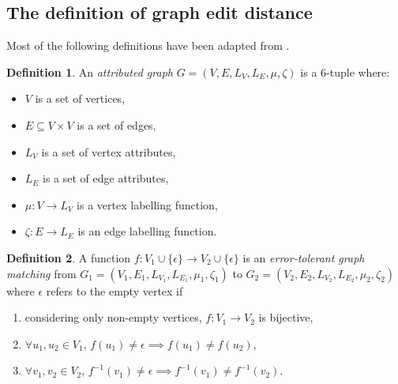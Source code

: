 \documentclass{article}
\theoremstyle{definition}
\newtheorem{definition}{Definition}
\begin{document}
\subsection{The definition of graph edit distance}
\label{sec:ged}
Most of the following definitions have been adapted from \cite{abu-aisheh_2016}.
\begin{definition}
  An \emph{attributed graph} $G = (V, E, L_V, L_E, \mu, \zeta)$ is a 6-tuple where:
  \begin{itemize}
  \item $V$ is a set of vertices,
  \item $E \subseteq V \times V$ is a set of edges,
  \item $L_V$ is a set of vertex attributes,
  \item $L_E$ is a set of edge attributes,
  \item $\mu : V \to L_V$ is a vertex labelling function,
  \item $\zeta : E \to L_E$ is an edge labelling function.
  \end{itemize}
\end{definition}
\begin{definition}
  A function $f: V_1 \cup \{ \epsilon \} \to V_2 \cup \{ \epsilon \}$ is an \emph{error-tolerant graph matching} from $G_1 = (V_1, E_1, L_{V_1}, L_{E_1}, \mu_1, \zeta_1)$ to $G_2 = (V_2, E_2, L_{V_2}, L_{E_2}, \mu_2, \zeta_2)$ where $\epsilon$ refers to the empty vertex if
  \begin{enumerate}
  \item considering only non-empty vertices, $f: V_1 \to V_2$ is bijective,
  \item $\forall u_1, u_2 \in V_1$, $f(u_1) \ne \epsilon \implies f(u_1) \ne f(u_2)$,
  \item $\forall v_1, v_2 \in V_2$, $f^{-1}(v_1) \ne \epsilon \implies f^{-1}(v_1) \ne f^{-1}(v_2)$.
  \end{enumerate}
\end{definition}
\end{document}
